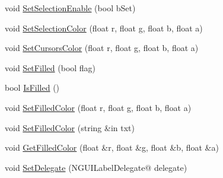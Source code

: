 \begin{DoxyCompactItemize}
\item 
void \hyperlink{class_n_g_u_i_label_ac8c8dfb1322cca4aba2545da11dbc962}{Set\+Selection\+Enable} (bool b\+Set)
\item 
void \hyperlink{class_n_g_u_i_label_a7a0ee6fe7fe0cf05aa5d280d8f135483}{Set\+Selection\+Color} (float r, float g, float b, float a)
\item 
void \hyperlink{class_n_g_u_i_label_aeaedd5d99d2219905c4021692066010e}{Set\+Cursors\+Color} (float r, float g, float b, float a)
\item 
void \hyperlink{class_n_g_u_i_label_a041111bf18ec5dcd5d9af01116ef9afe}{Set\+Filled} (bool flag)
\item 
bool \hyperlink{class_n_g_u_i_label_aa345615e896885d848026c369a5c7b4f}{Is\+Filled} ()
\item 
void \hyperlink{class_n_g_u_i_label_aee309217d9d3c8190512eaa69b669854}{Set\+Filled\+Color} (float r, float g, float b, float a)
\item 
void \hyperlink{class_n_g_u_i_label_adf874f49e227d37f20dd81fb3ef82e8d}{Set\+Filled\+Color} (string \&in txt)
\item 
void \hyperlink{class_n_g_u_i_label_a6804cd7f850215528d5f738e259b1a77}{Get\+Filled\+Color} (float \&r, float \&g, float \&b, float \&a)
\item 
void \hyperlink{class_n_g_u_i_label_a254f7a5bf382d6d00a2f8af608dbca33}{Set\+Delegate} (N\+G\+U\+I\+Label\+Delegate@ delegate)
\end{DoxyCompactItemize}

